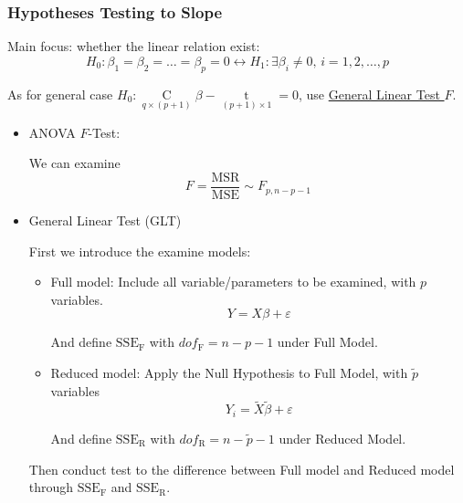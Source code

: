 \subsubsection{Hypotheses Testing to Slope}
    Main focus: whether the linear relation exist:
\begin{equation}
    H_0:\beta _1=\beta _2=\ldots=\beta _p=0\longleftrightarrow H_1:\exists \beta _i\neq 0,\, i=1,2,\ldots,p
\end{equation}

    As for general case $ H_0:\mathop{C}\limits_{q\times (p+1)} \beta -\mathop{t}\limits_{(p+1)\times 1}  = 0$, use \hyperlink{HyperlinkGLT}{General Linear Test $ F $}.

\begin{itemize}[topsep=2pt,itemsep=2pt]
\item ANOVA $ F $-Test:
    
    We can examine  
    \begin{equation}
        F=\dfrac{\mathrm{MSR}}{\mathrm{MSE}}\sim F_{p,n-p-1} 
    \end{equation}
    
\item General Linear Test (GLT)
    
    First we introduce the examine models:
    \begin{itemize}[topsep=2pt,itemsep=2pt]
        \item Full model: Include all variable/parameters to be examined, with $ p $ variables.
        \begin{equation}
            Y=X\beta +\varepsilon
        \end{equation}

        And define $ \mathrm{SSE}_\mathrm{F} $ with $ dof_\mathrm{F}=n-p-1 $ under Full Model.
        \item Reduced model: Apply the Null Hypothesis to Full Model, with $ \tilde{p} $ variables
        \begin{equation}
         Y_i=\tilde{X}\tilde{\beta }+\varepsilon 
        \end{equation}
        
        And define $ \mathrm{SSE}_\mathrm{R} $ with $ dof_\mathrm{R}=n-\tilde{p}-1 $ under Reduced Model.
    \end{itemize}

    Then conduct test to the difference between Full model and Reduced model through $ \mathrm{SSE}_\mathrm{F}  $ and $ \mathrm{SSE}_\mathrm{R}  $.


\end{itemize}
